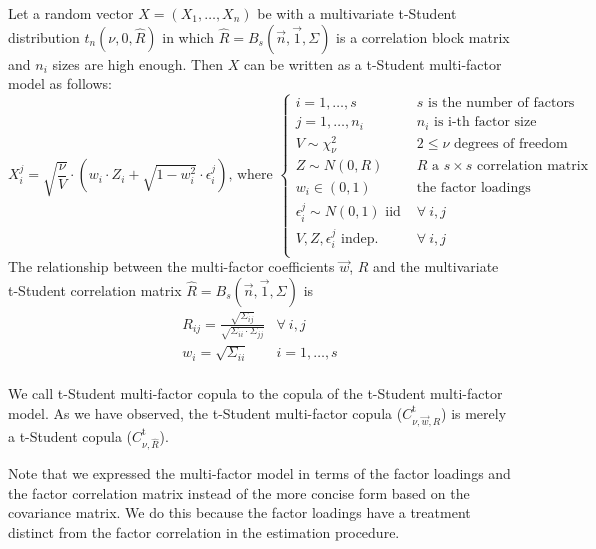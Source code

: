 \documentclass[11pt,fleqn]{book} %
\begin{document}
\begin{proposition}
	\label{prop:tmfm}
	Let a random vector $X=(X_1,\dots,X_n)$ be with a multivariate t-Student 
	distribution $t_n(\nu,0,\widehat{R})$ in which 
	$\widehat{R} = B_s(\vec{n},\vec{1},\Sigma)$ is a correlation block matrix 
	and $n_i$ sizes are high enough. Then $X$ can be written as a t-Student 
	multi-factor model as follows:
	\begin{displaymath}
		X_i^j = \sqrt{\frac{\nu}{V}} \cdot 
		\left( w_i \cdot Z_i + \sqrt{1-w_i^2} \cdot \epsilon_i^j \right)
		\text{, where } \left\{
		\begin{array}{ll}
			i = 1, \dots, s & \text{$s$ is the number of factors} \\
			j = 1, \dots, n_i & \text{$n_i$ is i-th factor size} \\
			V \sim \chi_{\nu}^2 & 2 \le \nu \text{ degrees of freedom} \\
			Z \sim N(0,R) & \text{$R$ a $s {\times} s$ correlation matrix} \\
			w_i \in (0,1) & \text{the factor loadings } \\
			\epsilon_i^j \sim N(0,1) \text { iid } & \forall\ i,j \\
			V, Z, \epsilon_i^j \text{ indep. } & \forall\ i,j \\
		\end{array}
		\right.
	\end{displaymath}
	The relationship between the multi-factor coefficients $\vec{w}$, $R$ 
	and the multivariate t-Student correlation matrix 
	$\widehat{R} = B_s(\vec{n},\vec{1},\Sigma)$ is
	\begin{displaymath}
		\begin{array}{ll}
			R_{ij} = \frac{\sqrt{\Sigma_{ij}}}{\sqrt{\Sigma_{ii} \cdot \Sigma_{jj}}} & \forall\ i,j \\
			w_i = \sqrt{\Sigma_{ii}} & i = 1,\dots,s \\
		\end{array}
	\end{displaymath}
\end{proposition}

We call t-Student multi-factor copula to the copula of the t-Student 
multi-factor model. As we have observed, the t-Student multi-factor copula 
($C_{\nu,\vec{w},R}^{\text{t}}$) is merely a t-Student copula 
($C_{\nu,\widehat{R}}^{\text{t}}$).

Note that we expressed the multi-factor model in terms of the factor loadings 
and the factor correlation matrix instead of the more concise form based on 
the covariance matrix. We do this because the factor loadings have a treatment 
distinct from the factor correlation in the estimation procedure.
\end{document}
